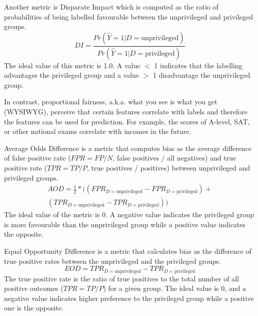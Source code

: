 \documentclass[sigconf,review]{acmart}
\begin{document}
Another metric is Disparate Impact \cite{feldman2015disparate,bellamy2018ai} which is computed as the ratio of probabilities of being labelled favourable between the unprivileged and privileged groups.
\begin{equation}
	DI = \frac{Pr(\hat{Y} = 1 | D = \text{unprivileged})}
	{Pr(\hat{Y} = 1 | D = \text{privileged})}
\end{equation}
The ideal value of this metric is 1.0. A value $<$ 1 indicates that the labelling advantages the privileged group and a value $>$ 1 disadvantage the unprivileged group.


In contrast, proportional fairness, a.k.a. what you see is what you get (WYSIWYG),  perceive that certain features correlate with labels and therefore the features can be used for prediction. For example, the scores of A-level, SAT, or other national exams correlate with incomes in the future.

Average Odds Difference \cite{bellamy2018ai} is a metric that computes bias as the average difference of false positive rate ($FPR = FP/N$, false positives / all negatives) and true positive rate ($TPR = TP/P$, true positives / positives) between unprivileged and privileged groups.
\begin{equation}
	\begin{aligned}
		AOD = \tfrac{1}{2}* ((FPR_{D = \text{unprivileged}} - FPR_{D = \text{privileged}}) +\\
		(TPR_{D = \text{unprivileged}} - TPR_{D = \text{privileged}}))
	\end{aligned}
\end{equation}
The ideal value of the metric is 0. A negative value indicates the privileged group is more favourable than the unprivileged group while a positive value indicates the opposite. 




Equal Opportunity Difference \cite{bellamy2018ai} is a metric that calculates bias as the difference of true positive rates between the unprivileged and the privileged groups. 
\begin{equation}
	EOD = TPR_{D = \text{unprivileged}} - TPR_{D = \text{privileged}}	
\end{equation}
The true positive rate is the ratio of true positives to the total number of all positive outcomes ($TPR=TP/P$) for a given group. The ideal value is 0, and a negative value indicates higher preference to the privileged group while a positive one is the opposite.
\end{document}
